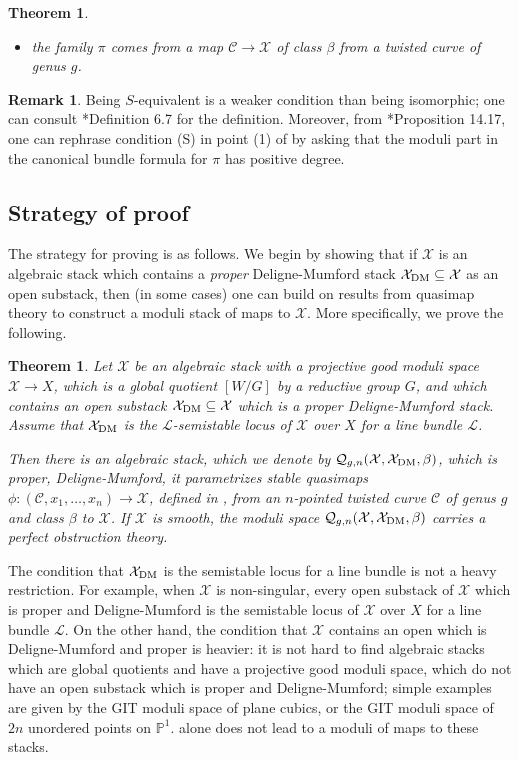 \documentclass{amsart}
\newcommand{\bP}{\mathbb{P}}
\newcommand{\sC}{\mathscr{C}}
\newcommand{\cL}{\mathcal{L}}
\newcommand{\cQ}{\mathcal{Q}}
\newcommand{\cX}{\mathcal{X}}
\newcommand{\dm}{{\rm DM}}
\newtheorem{Teo}[theorem]{Theorem}
\theoremstyle{definition}
\newtheorem{Remark}[theorem]{Remark}
\theoremstyle{definition}
\begin{document}
{\begin{Teo}
\begin{enumerate}
\begin{itemize}
            \item[(N)] the family $\pi$ comes from a map $\sC\to \cX$ of class $\beta$ from a twisted curve of genus $g$.
        \end{itemize}
    \end{enumerate}
\end{Teo}
\begin{Remark}Being $S$-equivalent is a weaker condition than being isomorphic; one can consult \cite{ascher2023moduli}*{Definition 6.7} for the definition.
    Moreover, from \cite{ascher2023moduli}*{Proposition 14.17}, one can rephrase condition (S) in point (1) of  by asking that the moduli part in the canonical bundle formula for $\pi$ has positive degree. 
\end{Remark}

\subsection{Strategy of proof}\label{subsection_strategy_of_proof}
 The strategy for proving  is as follows. We begin by showing that if $\cX$ is an algebraic stack which contains a \textit{proper} Deligne-Mumford stack $\cX_\dm\subseteq \cX$ as an open substack, then (in some cases) one can build on results from quasimap theory to construct a moduli stack of maps to $\cX$. More specifically, we prove the following.
 
\begin{Teo}\label{teo_intro_cX_contains_open_proper_dm} Let $\cX$ be an algebraic stack with a projective good moduli space $\cX\to X$, which is a global quotient $[W/G]$ by a reductive group $G$, and which contains an open substack $\cX_\dm\subseteq \cX$ which is a proper Deligne-Mumford stack.
Assume that $\cX_\dm$ is the $\cL$-semistable locus of $\cX$ over $X$ for a line bundle $\cL$. 

Then there is an algebraic stack, which we denote by $\cQ_{g,n}(\cX,\cX_\dm,\beta)$, which is proper, Deligne-Mumford, it parametrizes stable quasimaps $\phi:(\sC,x_1,\ldots,x_n)\to \cX$, defined in , from an $n$-pointed twisted curve $\sC$ of genus $g$ and class $\beta$ to $\cX$. If $\cX$ is smooth, the moduli space $\cQ_{g,n}(\cX,\cX_\dm,\beta)$ carries a perfect obstruction theory.
\end{Teo}
The condition that $\cX_\dm$ is the semistable locus for a line bundle is not a heavy restriction. For example, when $\cX$ is non-singular, every open substack of $\cX$ which is proper and Deligne-Mumford is the semistable locus of $\cX$ over $X$ for a line bundle $\cL$. On the other hand, the condition that $\cX$ contains an open which is Deligne-Mumford and proper is heavier: it is not hard to find algebraic stacks which are global quotients and have a projective good moduli space, which do not have an open substack which is proper and Deligne-Mumford; simple examples are given by the GIT moduli space of plane cubics, or the GIT moduli space of $2n$ unordered points on $\bP^1$.  alone does not lead to a moduli of maps to these stacks. 

}
\end{document}
